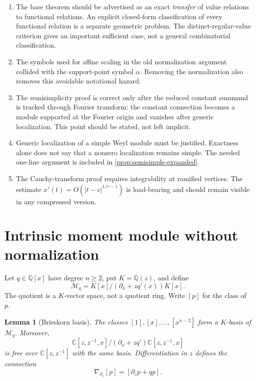 \documentclass[11pt]{article}
\numberwithin{equation}{section}
\newtheorem{lemma}[theorem]{Lemma}
\theoremstyle{definition}
\theoremstyle{remark}
\newcommand{\C}{\mathbb C}
\newcommand{\Qbar}{\overline{\mathbb Q}}
\newcommand{\Mcal}{\mathcal M}
\begin{document}
\begin{enumerate}[leftmargin=2.2em]
\item The base theorem should be advertised as an exact \emph{transfer} of
value relations to functional relations.  An explicit closed-form
classification of every functional relation is a separate geometric problem.
The distinct-regular-value criterion gives an important sufficient
case, not a general combinatorial classification.

\item The symbols used for affine scaling in the old normalization argument
collided with the support-point symbol $\alpha$.  Removing the normalization also
removes this avoidable notational hazard.

\item The semisimplicity proof is correct only after the reduced constant
summand is tracked through Fourier transform: the constant connection becomes
a module supported at the Fourier origin and vanishes after generic
localization.  This point should be stated, not left implicit.

\item Generic localization of a simple Weyl module must be justified.  Exactness
alone does not say that a nonzero localization remains simple.  The needed
one-line argument is included in \cref{prop:semisimple-expanded}.

\item The Cauchy-transform proof requires integrability at ramified vertices.
The estimate $x'(t)=O(|t-c|^{1/r-1})$ is load-bearing and should remain visible
in any compressed version.
\end{enumerate}

\section{Intrinsic moment module without normalization}

Let $q\in\Qbar[x]$ have degree $n\ge2$, put $K=\Qbar(z)$, and define
\begin{equation}\label{eq:twisted-module}
  \Mcal_q=K[x]\big/(\partial_x+zq'(x))K[x].
\end{equation}
The quotient is a $K$-vector space, not a quotient ring.  Write $[p]$ for
the class of $p$.

\begin{lemma}[Brieskorn basis]\label{lem:Brieskorn}
The classes $[1],[x],\ldots,[x^{n-2}]$ form a $K$-basis of $\Mcal_q$.
Moreover,
\[
  \C[z,z^{-1},x]\big/
  (\partial_x+zq')\C[z,z^{-1},x]
\]
is free over $\C[z,z^{-1}]$ with the same basis.  Differentiation in $z$
defines the connection
\[
  \nabla_{\partial_z}[p]=[\partial_z p+qp].
\]
\end{lemma}
\end{document}
